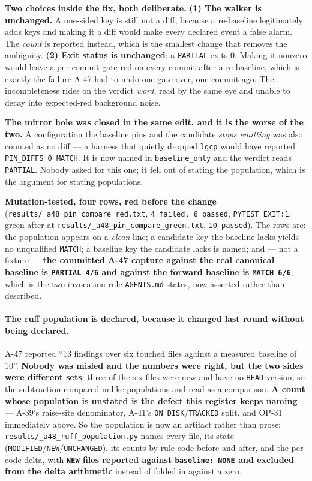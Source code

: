 \documentclass[
  10pt,
]{article}
\begin{document}
\textbf{Two choices inside the fix, both deliberate.} \textbf{(1) The walker is unchanged.} A one-sided key is still not a diff, because a re-baseline legitimately adds keys and making it a diff would make every declared event a false alarm. The \emph{count} is reported instead, which is the smallest change that removes the ambiguity. \textbf{(2) Exit status is unchanged}: a \texttt{PARTIAL} exits 0. Making it nonzero would leave a per-commit gate red on every commit after a re-baseline, which is exactly the failure A-47 had to undo one gate over, one commit ago. The incompleteness rides on the verdict \emph{word}, read by the same eye and unable to decay into expected-red background noise.

\textbf{The mirror hole was closed in the same edit, and it is the worse of the two.} A configuration the baseline pins and the candidate \emph{stops emitting} was also counted as no diff --- a harness that quietly dropped \texttt{lgcp} would have reported \texttt{PIN\_DIFFS 0 MATCH}. It is now named in \texttt{baseline\_only} and the verdict reads \texttt{PARTIAL}. Nobody asked for this one; it fell out of stating the population, which is the argument for stating populations.

\textbf{Mutation-tested, four rows, red before the change} (\texttt{results/\allowbreak{}\_a48\_pin\_compare\_red.txt}, \texttt{4 failed, 6 passed}, \texttt{PYTEST\_EXIT:1}; green after at \texttt{results/\allowbreak{}\_a48\_pin\_compare\_green.txt}, \texttt{10 passed}). The rows are: the population appears on a \emph{clean} line; a candidate key the baseline lacks yields no unqualified \texttt{MATCH}; a baseline key the candidate lacks is named; and --- not a fixture --- \textbf{the committed A-47 capture against the real canonical baseline is \texttt{PARTIAL 4/6} and against the forward baseline is \texttt{MATCH 6/6}}, which is the two-invocation rule \texttt{AGENTS.md} states, now asserted rather than described.

\paragraph{The ruff population is declared, because it changed last round without being declared.}
A-47 reported ``13 findings over six touched files against a measured baseline of 10''. \textbf{Nobody was misled and the numbers were right, but the two sides were different sets}: three of the six files were new and have no \texttt{HEAD} version, so the subtraction compared unlike populations and read as a comparison. \textbf{A count whose population is unstated is the defect this register keeps naming} --- A-39's raise-site denominator, A-41's \texttt{ON\_DISK}/\texttt{TRACKED} split, and OP-31 immediately above. So the population is now an artifact rather than prose: \texttt{results/\allowbreak{}\_a48\_ruff\_population.py} names every file, its state (\texttt{MODIFIED}/\texttt{NEW}/\texttt{UNCHANGED}), its counts by rule code before and after, and the per-code delta, with \textbf{\texttt{NEW} files reported against \texttt{baseline: NONE} and excluded from the delta arithmetic} instead of folded in against a zero.
\end{document}
